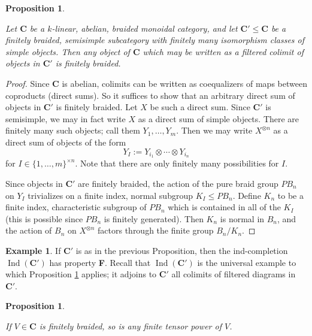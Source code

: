 \documentclass[12pt]{article}
\DeclareMathOperator{\Ind}{Ind}
\newcommand{\bC} {\mathbf{C}}
\theoremstyle{plain}
\newtheorem{prop}[thm]{Proposition}
\theoremstyle{definition}
\newtheorem{exmp}[thm]{Example}
\theoremstyle{remark}
\begin{document}
\begin{prop} \label{sums_prop}

Let $\bC$ be a $k$-linear, abelian, braided monoidal category, and let $\bC' \leq \bC$ be a finitely braided, semisimple subcategory with finitely many isomorphism classes of simple objects.  Then any object of $\bC$ which may be written as a filtered colimit of objects in $\bC'$ is finitely braided. 

\end{prop}

\begin{proof}

Since $\bC$ is abelian, colimits can be written as coequalizers of maps between coproducts (direct sums).  So it suffices to show that an arbitrary direct sum of objects in $\bC'$ is finitely braided.  Let $X$ be such a direct sum.  Since $\bC'$ is semisimple, we may in fact write $X$ as a direct sum of simple objects.  There are finitely many such objects; call them $Y_1, \dots, Y_m$.  Then we may write $X^{\otimes n}$ as a direct sum of objects of the form
%
$$Y_I := Y_{i_1} \otimes \cdots \otimes Y_{i_n}$$
%
for $I \in \{1, \dots, m\}^{\times n}$.  Note that there are only finitely many possibilities for $I$.

Since objects in $\bC'$ are finitely braided, the action of the pure braid group $PB_n$ on $Y_I$ trivializes on a finite index, normal subgroup $K_I \leq PB_n$.  Define $K_n$ to be a finite index, characteristic subgroup of $PB_n$ which is contained in all of the $K_I$ (this is possible since $PB_n$ is finitely generated).  Then $K_n$ is normal in $B_n$, and the action of $B_n$ on $X^{\otimes n}$ factors through the finite group $B_n / K_n$.

\end{proof} 

\begin{exmp}

If $\bC'$ is as in the previous Proposition, then the ind-completion $\Ind(\bC')$ has property {\bf F}.  Recall that $\Ind(\bC')$ is the universal example to which Proposition \ref{sums_prop} applies; it adjoins to $\bC'$ all colimits of filtered diagrams in $\bC'$.  

\end{exmp}

\begin{prop} \label{powers_fb_prop}

If $V\in \bC$ is finitely braided, so is any finite tensor power of $V$.

\end{prop}
\end{document}
